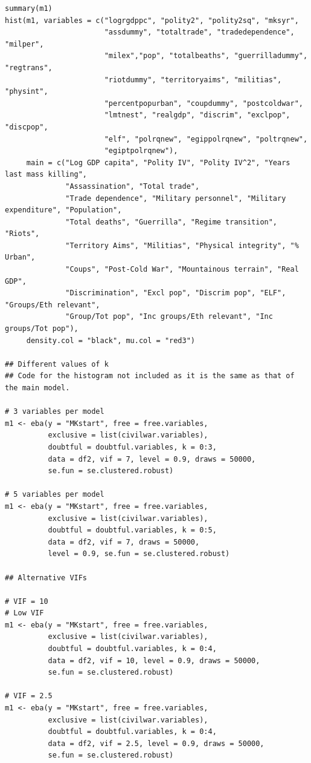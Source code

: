 \begin{verbatim}
summary(m1)
hist(m1, variables = c("logrgdppc", "polity2", "polity2sq", "mksyr",
                       "assdummy", "totaltrade", "tradedependence", "milper",
                       "milex","pop", "totalbeaths", "guerrilladummy", "regtrans",
                       "riotdummy", "territoryaims", "militias", "physint",
                       "percentpopurban", "coupdummy", "postcoldwar",
                       "lmtnest", "realgdp", "discrim", "exclpop", "discpop",
                       "elf", "polrqnew", "egippolrqnew", "poltrqnew",
                       "egiptpolrqnew"),
     main = c("Log GDP capita", "Polity IV", "Polity IV^2", "Years last mass killing",
              "Assassination", "Total trade", 
              "Trade dependence", "Military personnel", "Military expenditure", "Population", 
              "Total deaths", "Guerrilla", "Regime transition", "Riots",
              "Territory Aims", "Militias", "Physical integrity", "% Urban",
              "Coups", "Post-Cold War", "Mountainous terrain", "Real GDP",
              "Discrimination", "Excl pop", "Discrim pop", "ELF", "Groups/Eth relevant", 
              "Group/Tot pop", "Inc groups/Eth relevant", "Inc groups/Tot pop"),
     density.col = "black", mu.col = "red3")

## Different values of k
## Code for the histogram not included as it is the same as that of the main model.

# 3 variables per model
m1 <- eba(y = "MKstart", free = free.variables,
          exclusive = list(civilwar.variables),
          doubtful = doubtful.variables, k = 0:3,
          data = df2, vif = 7, level = 0.9, draws = 50000,
          se.fun = se.clustered.robust)

# 5 variables per model
m1 <- eba(y = "MKstart", free = free.variables,
          exclusive = list(civilwar.variables),
          doubtful = doubtful.variables, k = 0:5,
          data = df2, vif = 7, draws = 50000,
          level = 0.9, se.fun = se.clustered.robust)
          
## Alternative VIFs

# VIF = 10
# Low VIF
m1 <- eba(y = "MKstart", free = free.variables,
          exclusive = list(civilwar.variables),
          doubtful = doubtful.variables, k = 0:4,
          data = df2, vif = 10, level = 0.9, draws = 50000,
          se.fun = se.clustered.robust)

# VIF = 2.5
m1 <- eba(y = "MKstart", free = free.variables,
          exclusive = list(civilwar.variables),
          doubtful = doubtful.variables, k = 0:4,
          data = df2, vif = 2.5, level = 0.9, draws = 50000,
          se.fun = se.clustered.robust)


\end{verbatim}
